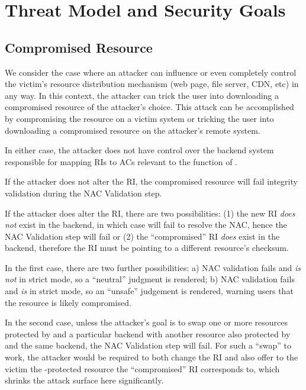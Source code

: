 \section{Threat Model and Security Goals} \label{sec:model}

\subsection{Compromised Resource}

We consider the case where an attacker can influence or even completely control
the victim's resource distribution mechanism (web page, file server, CDN, etc)
in any way. In this context, the attacker can trick the user into downloading a
compromised resource of the attacker's choice. This attack can be accomplished
by compromising the resource on a victim system or tricking the user into
downloading a compromised resource on the attacker's remote system.

In either case, the attacker does not have control over the backend system
responsible for mapping RIs to ACs relevant to the function of \SYSTEM{}.

If the attacker does not alter the RI, the compromised resource will fail
integrity validation during the NAC Validation step.

If the attacker does alter the RI, there are two possibilities: (1) the new RI
\textit{does not} exist in the backend, in which case \SYSTEM{} will fail to
resolve the NAC, hence the NAC Validation step will fail or (2) the
``compromised'' RI \textit{does} exist in the backend, therefore the RI must be
pointing to a different resource's checksum.

In the first case, there are two further possibilities: a) NAC validation fails
and \SYSTEM{} \emph{is not} in strict mode, so a ``neutral'' judgment is
rendered; b) NAC validation fails and \SYSTEM{} \emph{is} in strict mode, so an
``unsafe'' judgement is rendered, warning users that the resource is likely
compromised. 

In the second case, unless the attacker's goal is to swap one or more resources
protected by \SYSTEM{} and a particular backend with another resource also
protected by \SYSTEM{} and the same backend, the NAC Validation step will fail.
For such a ``swap'' to work, the attacker would be required to both change the
RI and also offer to the victim the \SYSTEM{}-protected resource the
``compromised'' RI corresponds to, which shrinks the attack surface here
significantly. 

